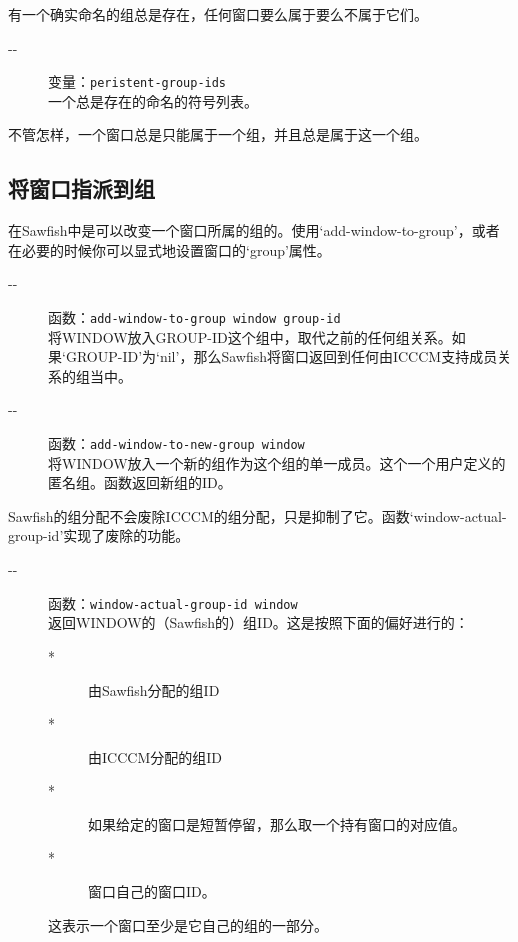 \documentclass{book}
\begin{document}
\begin{CJK*}{UTF8}{gbsn}
有一个确实命名的组总是存在，任何窗口要么属于要么不属于它们。
\begin{description}
\item[-{}-] 变量：\verb|peristent-group-ids|\\
一个总是存在的命名的符号列表。
\end{description}

不管怎样，一个窗口总是只能属于一个组，并且总是属于这一个组。
\subsection{将窗口指派到组}
在Sawfish中是可以改变一个窗口所属的组的。使用`add-window-to-group'，或者在必要的时候你可以显式地设置窗口的`group'属性。
\begin{description}
\item[-{}-] 函数：\verb|add-window-to-group window group-id|\\
将WINDOW放入GROUP-ID这个组中，取代之前的任何组关系。如果`GROUP-ID'为`nil'，那么Sawfish将窗口返回到任何由ICCCM支持成员关系的组当中。
\item[-{}-] 函数：\verb|add-window-to-new-group window|\\
将WINDOW放入一个新的组作为这个组的单一成员。这个一个用户定义的匿名组。函数返回新组的ID。
\end{description}

Sawfish的组分配不会废除ICCCM的组分配，只是抑制了它。函数`window-actual-group-id'实现了废除的功能。
\begin{description}
\item[-{}-] 函数：\verb|window-actual-group-id window|\\
返回WINDOW的（Sawfish的）组ID。这是按照下面的偏好进行的：
\begin{description}
\item[*] 由Sawfish分配的组ID
\item[*] 由ICCCM分配的组ID
\item[*] 如果给定的窗口是短暂停留，那么取一个持有窗口的对应值。
\item[*] 窗口自己的窗口ID。
\end{description}
这表示一个窗口至少是它自己的组的一部分。
\end{description}


\end{CJK*}
\end{document}
